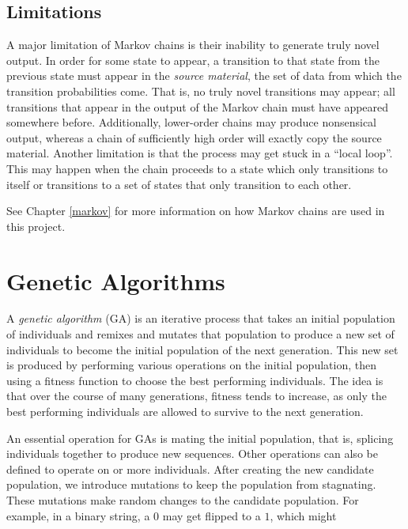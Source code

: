 \subsection{Limitations} \label{bg:markov:limitations}

A major limitation of Markov chains is their inability to generate truly novel output.
In order for some state to appear, a transition to that state from the previous state must appear in the \textit{source material}, the set of data from which the transition probabilities come.
That is, no truly novel transitions may appear; all transitions that appear in the output of the Markov chain must have appeared somewhere before.
Additionally, lower-order chains may produce nonsensical output, whereas a chain of sufficiently high order will exactly copy the source material.
Another limitation is that the process may get stuck in a ``local loop''.
This may happen when the chain proceeds to a state which only transitions to itself or transitions to a set of states that only transition to each other.

See Chapter \ref{markov} for more information on how Markov chains are used in this project.



\section{Genetic Algorithms} \label{bg:ga}

A \textit{genetic algorithm} (GA) is an iterative process that takes an initial population of individuals and remixes and mutates that population to produce a new set of individuals to become the initial population of the next generation.
This new set is produced by performing various operations on the initial population, then using a fitness function to choose the best performing individuals.
The idea is that over the course of many generations, fitness tends to increase, as only the best performing individuals are allowed to survive to the next generation.

An essential operation for GAs is mating the initial population, that is, splicing individuals together to produce new sequences.
Other operations can also be defined to operate on or more individuals.
After creating the new candidate population, we introduce mutations to keep the population from stagnating.
These mutations make random changes to the candidate population.
For example, in a binary string, a $0$ may get flipped to a $1$, which might 

